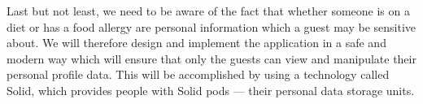 Last but not least, we need to be aware of the fact that whether someone is on a diet or has a food allergy are personal information which a guest may be sensitive about.
We will therefore design and implement the application in a safe and modern way which will ensure that only the guests can view and manipulate their personal profile data. This will be accomplished by using a technology called Solid, which provides people with Solid pods --- their personal data storage units.